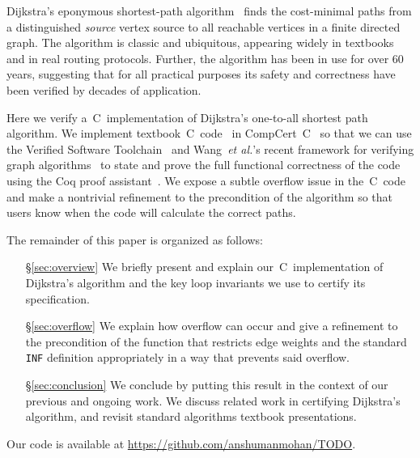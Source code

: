 Dijkstra's eponymous shortest-path algorithm~\cite{DBLP:journals/nm/Dijkstra59} finds
the cost-minimal paths from a distinguished \emph{source} vertex
source to all reachable vertices in a finite directed graph.
The algorithm is classic and ubiquitous, appearing widely in textbooks~\cite{clrs}
and in real routing protocols. Further, the algorithm has been in
use for over $60$ years, suggesting that for all practical purposes
its safety and correctness have been verified by decades of application.


Here we verify a~C~implementation of Dijkstra's one-to-all shortest path algorithm.
We implement textbook~C~code~\cite{clrs} in CompCert~C~\cite{leroy:compcert} so that
we can use the Verified Software Toolchain~\cite{appel:programlogics} and
Wang~\emph{et al.}'s recent framework for verifying graph algorithms~\cite{DBLP:journals/pacmpl/WangCMH19} to state and prove the full functional
correctness of the code using the Coq proof assistant~\cite{coq}.
We expose a subtle overflow issue in the~C~code and make a nontrivial refinement to the precondition of the algorithm so that users know when the code will calculate the correct paths.

The remainder of this paper is organized as follows:
\begin{itemize}
    \item[\S\ref{sec:overview}] We briefly present and explain
    our~C~implementation of Dijkstra's algorithm and the key loop invariants
    we use to certify its specification.
    \item[\S\ref{sec:overflow}] We explain how overflow can occur and give a
    refinement to the precondition of the function that restricts edge weights
    and the standard \texttt{INF} definition
    appropriately in a way that prevents said overflow.
    \item[\S\ref{sec:conclusion}] We conclude by putting this result in the context of our
    previous and ongoing work. We discuss related work in certifying Dijkstra's algorithm, and revisit standard algorithms textbook presentations.
\end{itemize} 

\noindent Our code is available at \url{https://github.com/anshumanmohan/TODO}.
